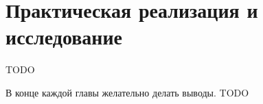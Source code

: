 \chapter{Практическая реализация и исследование}

TODO

\chapterconclusion

В конце каждой главы желательно делать выводы. TODO
